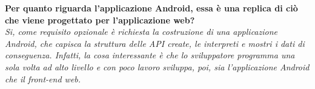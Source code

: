 	\textbf{Per quanto riguarda l'applicazione Android, essa è una replica di ciò che viene progettato per l'applicazione web?}\\
	\textit{Si, come requisito opzionale è richiesta la costruzione di una applicazione Android, che capisca la struttura delle API create, le interpreti e mostri i dati di conseguenza. Infatti, la cosa interessante è che lo sviluppatore programma una sola volta ad alto livello e con poco lavoro sviluppa, poi, sia l'applicazione Android che il front-end web.}\\